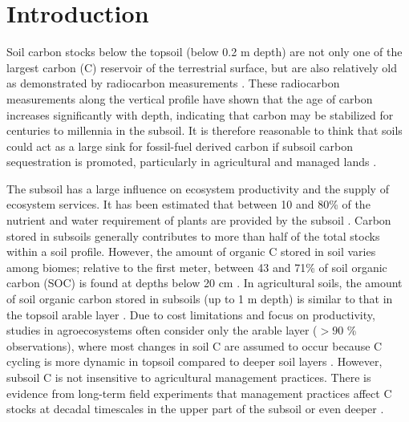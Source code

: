\documentclass[11pt, oneside, a4paper]{article}   	%
\providecommand{\DIFdelbegin}{} %
\providecommand{\DIFdelend}{} %
\newcommand{\DIFscaledelfig}{0.5}
\newlength{\DIFdelgraphicswidth} %
\newlength{\DIFdelgraphicsheight} %
\newcommand{\DIFdelincludegraphics}[2][]{%
\sbox{\DIFdelgraphicsbox}{\DIFOincludegraphics[#1]{#2}}%
\settoboxwidth{\DIFdelgraphicswidth}{\DIFdelgraphicsbox} %
\settoboxtotalheight{\DIFdelgraphicsheight}{\DIFdelgraphicsbox} %
\scalebox{\DIFscaledelfig}{%
\parbox[b]{\DIFdelgraphicswidth}{\usebox{\DIFdelgraphicsbox}\\[-\baselineskip] \rule{\DIFdelgraphicswidth}{0em}}\llap{\resizebox{\DIFdelgraphicswidth}{\DIFdelgraphicsheight}{%
\setlength{\unitlength}{\DIFdelgraphicswidth}%
\begin{picture}(1,1)%
\thicklines\linethickness{2pt} %
{\color[rgb]{1,0,0}\put(0,0){\framebox(1,1){}}}%
{\color[rgb]{1,0,0}\put(0,0){\line( 1,1){1}}}%
{\color[rgb]{1,0,0}\put(0,1){\line(1,-1){1}}}%
\end{picture}%
}\hspace*{3pt}}} %
} %
\DeclareRobustCommand{\DIFdelbegin}{\DIFOdelbegin \let\includegraphics\DIFdelincludegraphics} %
\DeclareRobustCommand{\DIFdelend}{\DIFOaddend \let\includegraphics\DIFOincludegraphics} %
\begin{document}
\DIFdelbegin %


\DIFdelend \section{Introduction}
Soil carbon stocks below the topsoil (below  0.2 m depth) are not only one of the largest carbon (C) reservoir of the terrestrial surface, but are also relatively old as demonstrated by radiocarbon measurements \citep{Mathieu2015, He2016, Shi2020, Heckman2022}. These radiocarbon measurements along the vertical profile have shown that the age of carbon increases significantly with depth, indicating that carbon may be stabilized for centuries to millennia in the subsoil. It is therefore reasonable to think that soils could act as a large sink for fossil-fuel derived carbon if subsoil carbon sequestration is promoted, particularly in agricultural and managed lands \citep{Rumpel2012, Button2022}. 

The subsoil has a large influence on ecosystem productivity and the supply of ecosystem services. It has been estimated that between 10 and 80\% of the nutrient and water requirement of plants are provided by the subsoil \citep{Hinzmann2021}. Carbon stored in subsoils generally contributes to more than half of the total stocks within a soil profile. However, the amount of organic C stored in soil varies among biomes; relative to the first meter, between 43 and 71\% of soil organic carbon (SOC) is found at depths below 20 cm \citep{Jobbagy2000}. In agricultural soils, the amount of soil organic carbon stored in subsoils (up to 1 m depth) is similar to that in the topsoil arable layer \citep{Morari2019}. Due to cost limitations and focus on productivity, studies in agroecosystems often consider only the arable layer ($>90$ \% observations), where most changes in soil C are assumed to occur because C cycling is more dynamic in topsoil compared to deeper soil layers \citep{Bolinder2020}. However, subsoil C is not insensitive to agricultural management practices. There is evidence from long-term field experiments that management practices affect C stocks at decadal timescales in the upper part of the subsoil or even deeper \citep[e.g.][]{Kirchmann2013, Kaetterer2014, Menichetti2015, Borjesson2018, DalFerro2020, Slessarev2020}.
\end{document}
